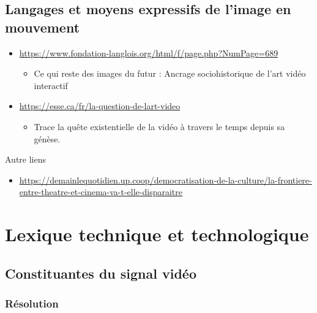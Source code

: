 \documentclass[
  french,
]{book}
\providecommand{\tightlist}{%
  \setlength{\itemsep}{0pt}\setlength{\parskip}{0pt}}
\begin{document}
\hypertarget{evolution_historique_language}{%
\section{Langages et moyens expressifs de l'image en mouvement}\label{evolution_historique_language}}

\begin{itemize}
\tightlist
\item
  \url{https://www.fondation-langlois.org/html/f/page.php?NumPage=689}

  \begin{itemize}
  \tightlist
  \item
    Ce qui reste des images du futur : Ancrage sociohistorique de l'art vidéo interactif\\
  \end{itemize}
\item
  \url{https://esse.ca/fr/la-question-de-lart-video}

  \begin{itemize}
  \tightlist
  \item
    Trace la quête existentielle de la vidéo à travers le temps depuis sa génèse.
  \end{itemize}
\end{itemize}

Autre liens

\begin{itemize}
\tightlist
\item
  \url{https://demainlequotidien.up.coop/democratisation-de-la-culture/la-frontiere-entre-theatre-et-cinema-va-t-elle-disparaitre}
\end{itemize}

\hypertarget{lexique}{%
\chapter{Lexique technique et technologique}\label{lexique}}

\hypertarget{lexique_composantes}{%
\section{Constituantes du signal vidéo}\label{lexique_composantes}}

\hypertarget{ruxe9solution}{%
\subsection{Résolution}\label{ruxe9solution}}
\end{document}
